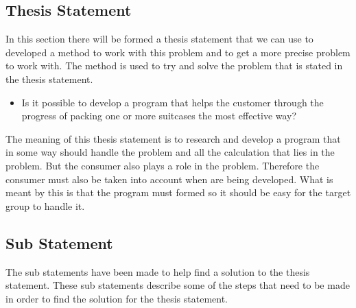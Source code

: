 \subsection{Thesis Statement}
In this section there will be formed a thesis statement that we can use to developed a method to work with this problem and to get a more precise problem to work with. The method is used to try and solve the problem that is stated in the thesis statement.

\begin{itemize}
\item Is it possible to develop a program that helps the customer through the progress of packing one or more suitcases the most effective way?
\end{itemize}

The meaning of this thesis statement is to research and develop a program that in some way should handle the problem and all the calculation that lies in the problem. But the consumer also plays a role in the problem.
Therefore the consumer must also be taken into account when are being developed. What is meant by this is that the program must formed so it should be easy for the target group to handle it.

\subsection*{Sub Statement}
The sub statements have been made to help find a solution to the thesis statement. These sub statements describe some of the steps that need to be made in order to find the solution for the thesis statement.

